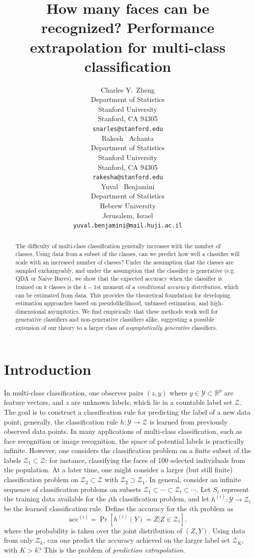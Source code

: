 \documentclass{article}
\title{How many faces can be recognized? Performance extrapolation for
  multi-class classification}
\author{
  Charles Y.~Zheng \\
  Department of Statistics\\
  Stanford University\\
  Stanford, CA 94305 \\
  \texttt{snarles@stanford.edu} \\
  \And
  Rakesh ~Achanta \\
  Department of Statistics\\
  Stanford University\\
  Stanford, CA 94305 \\
  \texttt{rakesha@stanford.edu} \\
  \And
  Yuval ~Benjamini \\
  Department of Statistics \\
  Hebrew University\\
  Jerusalem, Israel\\
  \texttt{yuval.benjamini@mail.huji.ac.il}
}
\begin{document}

\maketitle

\begin{abstract}
The difficulty of multi-class classification generally increases with
the number of classes.  Using data from a subset of the classes, 
can we predict how well a classifier will scale with an
increased number of classes?  Under the assumption that the classes
are sampled exchangeably, and under the assumption that
the classifier is generative (e.g. QDA or Naive Bayes), we show that the expected accuracy
when the classifier is trained on $k$ classes is the $k-1$st moment
of a \emph{conditional accuracy distribution}, which can be estimated from data.
This provides the theoretical foundation for developing estimation approaches based on pseudolikelihood, 
unbiased estimation, and high-dimensional asymptotics.
We find empirically that these methods work well for generative classifiers and non-generative classifiers alike,
suggesting a possible extension of our theory to a larger class of \emph{asymptotically generative} classifiers.
\end{abstract}

\section{Introduction}

In multi-class classification, one observes pairs $(z, y)$ where $y \in \mathcal{Y} \subset \mathbb{R}^p$ are feature vectors,
and $z$ are unknown labels, which lie in a countable label set $\mathcal{Z}$.  The goal is to construct a classification rule for
predicting the label of a new data point; generally, the classification rule $h: \mathcal{Y} \to \mathcal{Z}$
is learned from previously observed data points.  In many applications of multi-class classification,
such as face recognition or image recognition, the space of potential labels is practically infinite.
However, one considers the classification problem on a finite subset of the labels $\mathcal{Z}_1 \subset \mathcal{Z}$:
for instance, classifying the faces of 100 selected individuals from the population.
At a later time, one might consider a larger (but still finite) classification problem on $\mathcal{Z}_2 \subset \mathcal{Z}$
with $\mathcal{Z}_2 \supset \mathcal{Z}_1$.
In general, consider an infinite sequence of classification problems on subsets $\mathcal{Z}_1 \subset \cdots \subset \mathcal{Z}_t \subset \cdots$.  
Let $S_i$ represent the training data available for the $i$th classification problem,
and let $h^{(i)}: \mathcal{Y} \to \mathcal{Z}_i$ be the learned classification rule.
Define the accuracy for the $i$th problem as
\[
\text{acc}^{(i)} = \Pr[h^{(i)}(Y) = Z|Z \in \mathcal{Z}_i].
\]
where the probability is taken over the joint distribution of $(Z, Y)$.
Using data from only $\mathcal{Z}_k$, can one predict the accuracy achieved on the larger label set $\mathcal{Z}_K$, with $K> k$?  This is the problem of \emph{prediction extrapolation}.
\end{document}
